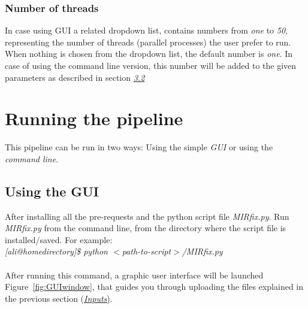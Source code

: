 \documentclass[a4paper,20pt]{report}
\begin{document}
\subsection{Number of threads}
\label{sec:threads}
\noindent
In case using GUI a related dropdown list, contains numbers from \textit{one} to \textit{50}, representing the number of 
threads (parallel processes) the user prefer to run. When nothing is chosen from the dropdown list, the default number is \textit{one}.
In case of using the command line version, this number will be added to the given parameters as described in section \hyperref[sec:cmnd]{\textit{3.2}}
\chapter*{Running the pipeline}
This pipeline can be run in two ways: Using the simple \textit{GUI} or using the \textit{command line}.
\section{Using the GUI}
\noindent
After installing all the pre-requests and the  python script file \textit{MIRfix.py}. Run \textit{MIRfix.py} from the command line, from the directory 
where the script file is installed/saved. For example:\\
\textit{[ali@homedirectory]\$ python \hspace{0.2cm}$<$path-to-script$>$/MIRfix.py}\\\\
After running this command, a graphic user interface will be launched Figure~\ref{fig:GUIwindow}, that guides you through uploading the files explained 
in the previous section (\hyperref[chap:inputs]{\textit{Inputs})}.
\end{document}
